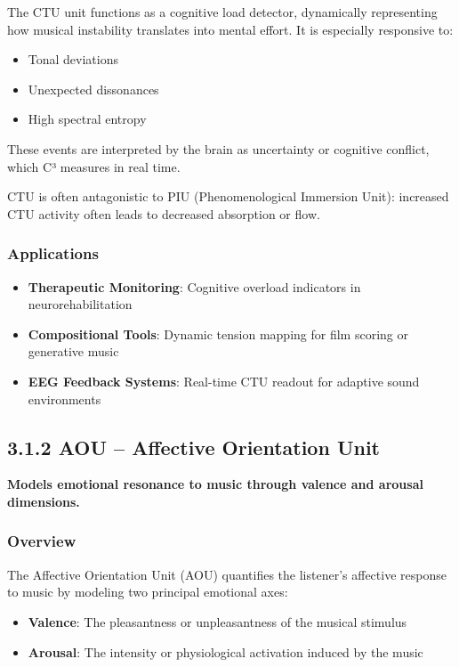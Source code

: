 The CTU unit functions as a cognitive load detector, dynamically representing how musical instability translates into mental effort. It is especially responsive to:

\begin{itemize}
    \item Tonal deviations
    \item Unexpected dissonances
    \item High spectral entropy
\end{itemize}

These events are interpreted by the brain as uncertainty or cognitive conflict, which C³ measures in real time.

CTU is often antagonistic to PIU (Phenomenological Immersion Unit): increased CTU activity often leads to decreased absorption or flow.

\subsubsection*{Applications}

\begin{itemize}
    \item \textbf{Therapeutic Monitoring}: Cognitive overload indicators in neurorehabilitation
    \item \textbf{Compositional Tools}: Dynamic tension mapping for film scoring or generative music
    \item \textbf{EEG Feedback Systems}: Real-time CTU readout for adaptive sound environments
\end{itemize}

\subsection*{3.1.2 AOU – Affective Orientation Unit}

\textbf{Models emotional resonance to music through valence and arousal dimensions.}

\subsubsection*{Overview}

The Affective Orientation Unit (AOU) quantifies the listener’s affective response to music by modeling two principal emotional axes:

\begin{itemize}
    \item \textbf{Valence}: The pleasantness or unpleasantness of the musical stimulus
    \item \textbf{Arousal}: The intensity or physiological activation induced by the music
\end{itemize}

